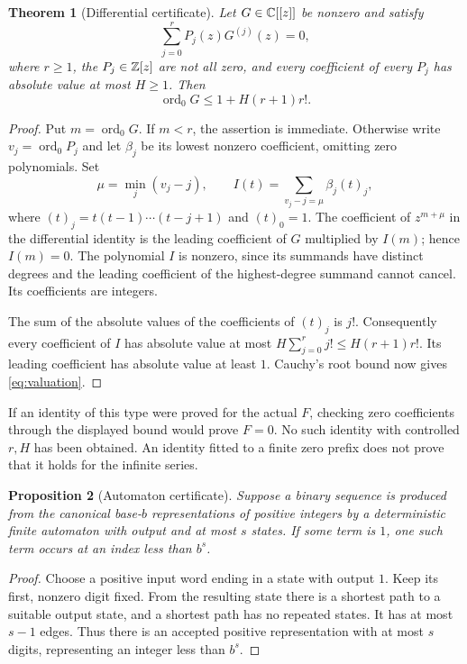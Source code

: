 \documentclass[11pt,a4paper]{article}
\newtheorem{theorem}{Theorem}[section]
\newtheorem{proposition}[theorem]{Proposition}
\theoremstyle{definition}
\theoremstyle{remark}\newtheorem{remark}[theorem]{Remark}
\newcommand{\ord}{\operatorname{ord}}
\begin{document}
\begin{theorem}[Differential certificate]\label{thm:ODE}
Let $G\in\mathbb C[[z]]$ be nonzero and satisfy
\[
 \sum_{j=0}^r P_j(z)G^{(j)}(z)=0,
\]
where $r\ge1$, the $P_j\in\mathbb Z[z]$ are not all zero, and every
coefficient of every $P_j$ has absolute value at most $H\ge1$.
Then
\begin{equation}\label{eq:valuation}
 \ord_0G\le1+H(r+1)r!.
\end{equation}
\end{theorem}
\begin{proof}
Put $m=\ord_0G$. If $m<r$, the assertion is immediate. Otherwise
write $v_j=\ord_0P_j$ and let $\beta_j$ be its lowest nonzero
coefficient, omitting zero polynomials. Set
\[
 \mu=\min_j(v_j-j),\qquad
 I(t)=\sum_{v_j-j=\mu}\beta_j(t)_j,
\]
where $(t)_j=t(t-1)\cdots(t-j+1)$ and $(t)_0=1$.
The coefficient of $z^{m+\mu}$ in the differential identity is
the leading coefficient of $G$ multiplied by $I(m)$; hence $I(m)=0$.
The polynomial $I$ is nonzero, since its summands have distinct
degrees and the leading coefficient of the highest-degree summand
cannot cancel. Its coefficients are integers.

The sum of the absolute values of the coefficients of $(t)_j$
is $j!$. Consequently every coefficient of $I$ has absolute value
at most $H\sum_{j=0}^rj!\le H(r+1)r!$. Its leading coefficient
has absolute value at least $1$. Cauchy's root bound now gives
\eqref{eq:valuation}.
\end{proof}

If an identity of this type were proved for the actual $F$, checking
zero coefficients through the displayed bound would prove $F=0$.
No such identity with controlled $r,H$ has been obtained. An identity
fitted to a finite zero prefix does not prove that it holds for the
infinite series.

\begin{proposition}[Automaton certificate]\label{prop:automaton}
Suppose a binary sequence is produced from the canonical base-$b$
representations of positive integers by a deterministic finite
automaton with output and at most $s$ states. If some term is $1$,
one such term occurs at an index less than $b^s$.
\end{proposition}
\begin{proof}
Choose a positive input word ending in a state with output $1$.
Keep its first, nonzero digit fixed. From the resulting state there
is a shortest path to a suitable output state, and a shortest path
has no repeated states. It has at most $s-1$ edges. Thus there is
an accepted positive representation with at most $s$ digits,
representing an integer less than $b^s$.
\end{proof}
\end{document}
